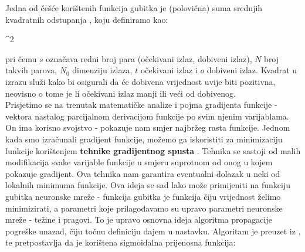 Jedna od češće korištenih funkcija gubitka je (polovična) suma srednjih kvadratnih odstupanja , koju definiramo kao:

\begin{myequation}%
^{2}   %
\end{myequation}

\noindent pri čemu $s$ označava redni broj para (očekivani izlaz, dobiveni izlaz), $N$ broj takvih parova, $N_{0}$ dimenziju izlaza, $t$ očekivani izlaz i $o$ dobiveni izlaz. Kvadrat u izrazu služi kako bi osigurali da će dobivena vrijednost uvije biti pozitivna, neovisno o tome je li očekivani izlaz manji ili veći od dobivenog.\\

\noindent Prisjetimo se na trenutak matematičke analize i pojma gradijenta funkcije - vektora nastalog parcijalnom derivacijom funkcije po svim njenim varijablama. On ima korisno svojstvo - pokazuje nam smjer najbržeg rasta funkcije. Jednom kada smo izračunali gradijent funkcije, možemo ga iskoristiti za minimizaciju funkcije korištenjem \textbf{tehnike gradijentnog spusta} . Tehnika se sastoji od malih modifikacija svake varijable funkcije u smjeru suprotnom od onog u kojem pokazuje gradijent. Ova tehnika nam garantira eventualni dolazak u neki od lokalnih minimuma funkcije. \citep{deeplearningbook}
Ova ideja se sad lako može primijeniti na funkciju gubitka neuronske mreže - funkcija gubitka je funkcija čiju vrijednost želimo minimizirati, a parametri koje prilagođavamo su upravo parametri neuronske mreže - težine i pragovi. To je upravo osnovna ideja algoritma propagacije pogreške unazad, čiju točnu definiciju dajem u nastavku. Algoritam je preuzet iz \citep{umjetneNNJava}, te pretpostavlja da je korištena sigmoidalna prijenosna funkcija:




